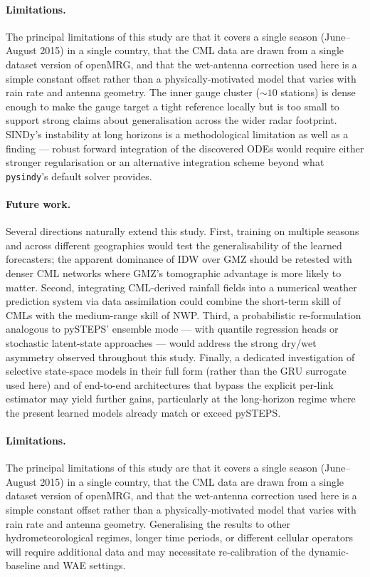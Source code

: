 \documentclass[12pt, a4paper]{article}
\begin{document}
\paragraph{Limitations.} The principal limitations of this study are
that it covers a single season (June--August 2015) in a single
country, that the CML data are drawn from a single dataset version of
openMRG, and that the wet-antenna correction used here is a simple
constant offset rather than a physically-motivated model that varies
with rain rate and antenna geometry. The inner gauge cluster ($\sim 10$
stations) is dense enough to make the gauge target a tight reference
locally but is too small to support strong claims about generalisation
across the wider radar footprint. SINDy's instability at long
horizons is a methodological limitation as well as a finding ---
robust forward integration of the discovered ODEs would require
either stronger regularisation or an alternative integration scheme
beyond what \texttt{pysindy}'s default solver provides.

\paragraph{Future work.} Several directions naturally extend this
study. First, training on multiple seasons and across different
geographies would test the generalisability of the learned
forecasters; the apparent dominance of IDW over GMZ should be
retested with denser CML networks where GMZ's tomographic advantage
is more likely to matter. Second, integrating CML-derived rainfall
fields into a numerical weather prediction system via data
assimilation could combine the short-term skill of CMLs with the
medium-range skill of NWP. Third, a probabilistic re-formulation
analogous to pySTEPS' ensemble mode --- with quantile regression heads
or stochastic latent-state approaches --- would address the strong
dry/wet asymmetry observed throughout this study. Finally, a
dedicated investigation of selective state-space models in their full
form (rather than the GRU surrogate used here) and of end-to-end
architectures that bypass the explicit per-link estimator may yield
further gains, particularly at the long-horizon regime where the
present learned models already match or exceed pySTEPS.

\paragraph{Limitations.} The principal limitations of this study are
that it covers a single season (June--August 2015) in a single country,
that the CML data are drawn from a single dataset version of openMRG,
and that the wet-antenna correction used here is a simple constant
offset rather than a physically-motivated model that varies with rain
rate and antenna geometry. Generalising the results to other
hydrometeorological regimes, longer time periods, or different cellular
operators will require additional data and may necessitate
re-calibration of the dynamic-baseline and WAE settings.
\end{document}
